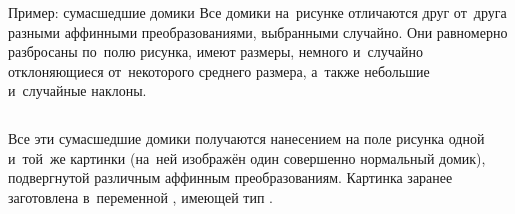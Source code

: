 
\begin{frame}{Пример: сумасшедшие домики}
Все домики на~рисунке отличаются друг от~друга разными аффинными
преобразованиями, выбранными случайно. Они равномерно разбросаны по~полю
рисунка, имеют размеры, немного и~случайно отклоняющиеся от~некоторого среднего
размера, а~также небольшие и~случайные наклоны.

\bigskip

\begin{columns}[onlytextwidth]
Все эти сумасшедшие домики получаются нанесением на поле рисунка одной и~той~же
картинки (на~ней изображён один совершенно нормальный домик), подвергнутой
различным аффинным преобразованиям. Картинка заранее заготовлена в~переменной
, имеющей тип .
\centerline{}
\end{columns}
\end{frame}


